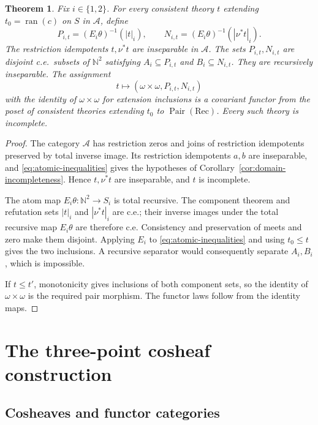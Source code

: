 \documentclass[11pt]{article}
\newtheorem{theorem}{Theorem}[section]
\newcommand{\N}{\mathbb N}
\newcommand{\ran}{\operatorname{ran}}
\begin{document}
\begin{theorem}\label{thm:cosheaf-observation}
Fix $i\in\{1,2\}$. For every consistent theory $t$ extending
$t_0=\ran(c)$ on $S$ in $\mathcal A$, define
\[
 P_{i,t}=(E_i\theta)^{-1}(|t|_i),\qquad
 N_{i,t}=(E_i\theta)^{-1}(|\nu^*t|_i).
\]
The restriction idempotents $t,\nu^*t$ are inseparable in $\mathcal A$.
The sets $P_{i,t},N_{i,t}$ are disjoint c.e.\ subsets of $\N^2$ satisfying
$A_i\subseteq P_{i,t}$ and $B_i\subseteq N_{i,t}$.
They are recursively inseparable. The assignment
\[
 t\longmapsto(\omega\times\omega,P_{i,t},N_{i,t})
\]
with the identity of $\omega\times\omega$ for extension inclusions is a
covariant functor from the poset of consistent theories extending
$t_0$ to $\operatorname{Pair}(\mathrm{Rec})$.
Every such theory is incomplete.
\end{theorem}
\begin{proof}
The category $\mathcal A$ has restriction zeros and joins of restriction idempotents
preserved by total inverse image. Its restriction idempotents $a,b$ are inseparable,
and \eqref{eq:atomic-inequalities} gives the hypotheses of
Corollary~\ref{cor:domain-incompleteness}. Hence $t,\nu^*t$ are
inseparable, and $t$ is incomplete.

The atom map $E_i\theta:\N^2\to S_i$ is total recursive.
The component theorem and refutation sets $|t|_i$ and $|\nu^*t|_i$
are c.e.; their inverse images under the total recursive map
$E_i\theta$ are therefore c.e. Consistency and preservation of meets and
zero make them disjoint. Applying $E_i$ to
\eqref{eq:atomic-inequalities} and using $t_0\le t$ gives
the two inclusions. A recursive separator would consequently
separate $A_i,B_i$, which is impossible.

If $t\le t'$, monotonicity gives inclusions of both component
sets, so the identity of $\omega\times\omega$ is the required pair morphism.
The functor laws follow from the identity maps.
\end{proof}

\appendix

\section{The three-point cosheaf construction}\label{app:fork-structure}

\subsection{Cosheaves and functor categories}
\end{document}
